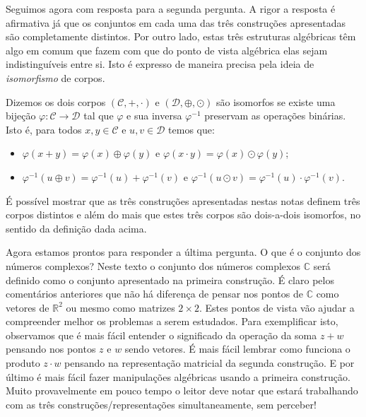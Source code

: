\bigskip 

Seguimos agora com resposta para a segunda pergunta. 
A rigor a resposta é afirmativa já que os conjuntos em cada uma das três construções
apresentadas são completamente distintos. Por outro lado, estas três estruturas algébricas
têm algo em comum que fazem com que do ponto de vista algébrica elas sejam indistinguíveis 
entre si. Isto é expresso de maneira precisa pela ideia 
de \textit{isomorfismo} de corpos. 


\begin{definicao}\label{def-isomorfismo-corpos}
Dizemos os dois corpos $(\mathscr{C},+,\cdot)$ e $(\mathscr{D},\oplus,\odot)$ são 
isomorfos se existe uma bijeção $\varphi:\mathscr{C}\to\mathscr{D}$ tal que $\varphi$ 
e sua inversa $\varphi^{-1}$ preservam 
as operações binárias. Isto é, para todos $x,y\in\mathscr{C}$ e $u,v \in\mathscr{D}$
temos que:
\begin{itemize} 
\item 
$\varphi(x+y)=\varphi(x)\oplus\varphi(y)$ \quad e \quad $\varphi(x\cdot y)=\varphi(x)\odot \varphi(y)$;
\item 
$\varphi^{-1}(u\oplus v)=\varphi^{-1}(u)+\varphi^{-1}(v)$ \quad e \quad
$\varphi^{-1}(u\odot v)= \varphi^{-1}(u)\cdot \varphi^{-1}(v)$.
\end{itemize}
\end{definicao} 


É possível mostrar que as três construções apresentadas nestas notas definem três corpos distintos e
além do mais que estes três corpos são dois-a-dois isomorfos, no sentido da definição dada acima.


Agora estamos prontos para responder a última pergunta. O que é o conjunto dos números complexos?
Neste texto o conjunto dos números complexos $\mathbb{C}$
será definido como o conjunto apresentado na primeira
construção. É claro pelos comentários anteriores que não há diferença de pensar nos pontos 
de $\mathbb{C}$ como vetores de $\mathbb{R}^2$ ou mesmo como matrizes $2\times 2$. Estes pontos
de vista vão ajudar a compreender melhor os problemas a serem estudados. 
Para exemplificar isto, observamos que é mais fácil entender o significado da operação da soma $z+w$
pensando nos pontos $z$ e $w$ sendo vetores. É mais fácil lembrar como funciona o produto
$z\cdot w$ pensando na representação matricial da segunda construção. E por último é mais
fácil fazer manipulações algébricas usando a primeira construção. 
Muito provavelmente em pouco tempo o leitor deve notar que estará 
trabalhando com as três construções/representações 
simultaneamente, sem perceber!


